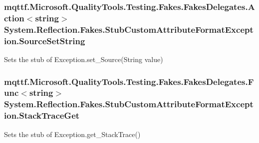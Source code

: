 \hypertarget{class_system_1_1_reflection_1_1_fakes_1_1_stub_custom_attribute_format_exception_a1db4f6ddfb8a20abb163c197cb68095e}{
\subsubsection[{Source\-Set\-String}]{\setlength{\rightskip}{0pt plus 5cm}mqttf.\-Microsoft.\-Quality\-Tools.\-Testing.\-Fakes.\-Fakes\-Delegates.\-Action$<$string$>$ System.\-Reflection.\-Fakes.\-Stub\-Custom\-Attribute\-Format\-Exception.\-Source\-Set\-String}}\label{class_system_1_1_reflection_1_1_fakes_1_1_stub_custom_attribute_format_exception_a1db4f6ddfb8a20abb163c197cb68095e}


Sets the stub of Exception.\-set\-\_\-\-Source(\-String value)

\hypertarget{class_system_1_1_reflection_1_1_fakes_1_1_stub_custom_attribute_format_exception_aac0412540819216a21c5ad7d331e327b}{
\subsubsection[{Stack\-Trace\-Get}]{\setlength{\rightskip}{0pt plus 5cm}mqttf.\-Microsoft.\-Quality\-Tools.\-Testing.\-Fakes.\-Fakes\-Delegates.\-Func$<$string$>$ System.\-Reflection.\-Fakes.\-Stub\-Custom\-Attribute\-Format\-Exception.\-Stack\-Trace\-Get}}\label{class_system_1_1_reflection_1_1_fakes_1_1_stub_custom_attribute_format_exception_aac0412540819216a21c5ad7d331e327b}


Sets the stub of Exception.\-get\-\_\-\-Stack\-Trace()

